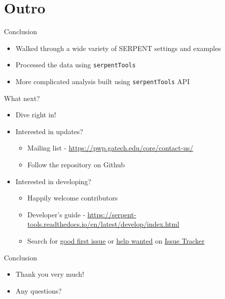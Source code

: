 \documentclass{beamer}
\newcommand{\st}{\texttt{serpentTools} }
\begin{document}
\section*{Outro}

\begin{frame}{Conclusion}
    \begin{itemize}
        \item Walked through a wide variety of SERPENT settings and examples
        \item Processed the data using \st
        \item More complicated analysis built using \st API
    \end{itemize}
\end{frame}

\begin{frame}{What next?}
    \begin{itemize}
        \item{Dive right in!}
        \item{Interested in updates?}
        \begin{itemize}
            \item{Mailing list - \url{https://pwp.gatech.edu/core/contact-us/}}
            \item{Follow the repository on Github}
        \end{itemize}
        \item{Interested in developing?}
        \begin{itemize}
            \item{Happily welcome contributors}
            \item{Developer's guide - \url{https://serpent-tools.readthedocs.io/en/latest/develop/index.html}}
            \item{Search for \href{https://github.com/CORE-GATECH-GROUP/serpent-tools/issues?q=is\%3Aissue+is\%3Aopen+label\%3A\%22good+first+issue\%22}{good first issue}
                or \href{https://github.com/CORE-GATECH-GROUP/serpent-tools/issues?q=is\%3Aissue+is\%3Aopen+label\%3A\%22help+wanted\%22}{help wanted}
                on \href{https://github.com/CORE-GATECH-GROUP/serpent-tools/issues}{Issue Tracker}}
        \end{itemize}
    \end{itemize}
\end{frame}

\begin{frame}{Conclusion}
    \begin{itemize}
        \item{Thank you very much!}
        \item{Any questions?}
    \end{itemize}
\end{frame}
\end{document}
